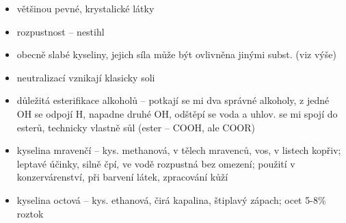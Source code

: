 \documentclass{article}
\begin{document}
\begin{itemize}
  \item většinou pevné, krystalické látky
  \item rozpustnost -- nestihl
  \item obecně slabé kyseliny, jejich síla může být ovlivněna jinými subst. (viz výše)
  \item neutralizací vznikají klasicky soli
  \item důležitá esterifikace alkoholů -- potkají se mi dva správné alkoholy, z jedné OH se odpojí H, napadne druhé OH, odštěpí se voda a uhlov. se mi spojí do esterů, technicky vlastně sůl (ester -- COOH, ale COOR)
  \item kyselina mravenčí -- kys. methanová, v tělech mravenců, vos, v listech kopřiv; leptavé účinky, silně čpí, ve vodě rozpustná bez omezení; použití v konzervárenství, při barvení látek, zpracování kůží
  \item kyselina octová -- kys. ethanová, čirá kapalina, štiplavý zápach; ocet 5-8\% roztok
\end{itemize}
\end{document}

